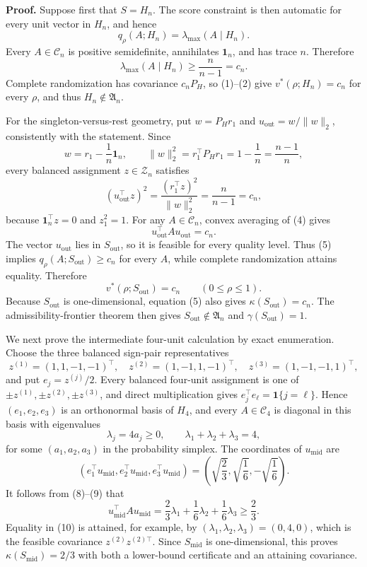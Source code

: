 \textbf{Proof.}
Suppose first that \(S=H_n\). The score constraint is then automatic for every unit vector in \(H_n\), and hence
\[
q_\rho(A;H_n)=\lambda_{\max}(A\mid H_n).
\tag{1}
\]
Every \(A\in\mathcal C_n\) is positive semidefinite, annihilates \(\mathbf1_n\), and has trace \(n\). Therefore
\[
\lambda_{\max}(A\mid H_n)\geq\frac{n}{n-1}=c_n.
\tag{2}
\]
Complete randomization has covariance \(c_nP_H\), so (1)--(2) give \(v^*(\rho;H_n)=c_n\) for every \(\rho\), and thus \(H_n\notin\mathfrak A_n\).

For the singleton-versus-rest geometry, put \(w=P_Hr_1\) and \(u_{\mathrm{out}}=w/\|w\|_2\), consistently with the statement. Since
\[
w=r_1-\frac1n\mathbf1_n,
\qquad
\|w\|_2^2=r_1^\top P_Hr_1=1-\frac1n=\frac{n-1}{n},
\tag{3}
\]
every balanced assignment \(z\in\mathcal Z_n\) satisfies
\[
(u_{\mathrm{out}}^\top z)^2
=\frac{(r_1^\top z)^2}{\|w\|_2^2}
=\frac{n}{n-1}=c_n,
\tag{4}
\]
because \(\mathbf1_n^\top z=0\) and \(z_1^2=1\). For any \(A\in\mathcal C_n\), convex averaging of (4) gives
\[
u_{\mathrm{out}}^\top Au_{\mathrm{out}}=c_n.
\tag{5}
\]
The vector \(u_{\mathrm{out}}\) lies in \(S_{\mathrm{out}}\), so it is feasible for every quality level. Thus (5) implies \(q_\rho(A;S_{\mathrm{out}})\geq c_n\) for every \(A\), while complete randomization attains equality. Therefore
\[
v^*(\rho;S_{\mathrm{out}})=c_n
\qquad(0\leq\rho\leq1).
\tag{6}
\]
Because \(S_{\mathrm{out}}\) is one-dimensional, equation (5) also gives \(\kappa(S_{\mathrm{out}})=c_n\). The admissibility-frontier theorem then gives \(S_{\mathrm{out}}\notin\mathfrak A_n\) and \(\gamma(S_{\mathrm{out}})=1\).

We next prove the intermediate four-unit calculation by exact enumeration. Choose the three balanced sign-pair representatives
\[
z^{(1)}=(1,1,-1,-1)^\top,
\quad
z^{(2)}=(1,-1,1,-1)^\top,
\quad
z^{(3)}=(1,-1,-1,1)^\top,
\tag{7}
\]
and put \(e_j=z^{(j)}/2\). Every balanced four-unit assignment is one of \(\pm z^{(1)},\pm z^{(2)},\pm z^{(3)}\), and direct multiplication gives \(e_j^\top e_\ell=\mathbf1\{j=\ell\}\). Hence \((e_1,e_2,e_3)\) is an orthonormal basis of \(H_4\), and every \(A\in\mathcal C_4\) is diagonal in this basis with eigenvalues
\[
\lambda_j=4a_j\geq0,
\qquad
\lambda_1+\lambda_2+\lambda_3=4,
\tag{8}
\]
for some \((a_1,a_2,a_3)\) in the probability simplex. The coordinates of \(u_{\mathrm{mid}}\) are
\[
(e_1^\top u_{\mathrm{mid}},e_2^\top u_{\mathrm{mid}},e_3^\top u_{\mathrm{mid}})
=\left(\sqrt{\frac23},\sqrt{\frac16},-\sqrt{\frac16}\right).
\tag{9}
\]
It follows from (8)--(9) that
\[
u_{\mathrm{mid}}^\top Au_{\mathrm{mid}}
=\frac23\lambda_1+\frac16\lambda_2+\frac16\lambda_3
\geq\frac23.
\tag{10}
\]
Equality in (10) is attained, for example, by \((\lambda_1,\lambda_2,\lambda_3)=(0,4,0)\), which is the feasible covariance \(z^{(2)}z^{(2)\top}\). Since \(S_{\mathrm{mid}}\) is one-dimensional, this proves \(\kappa(S_{\mathrm{mid}})=2/3\) with both a lower-bound certificate and an attaining covariance.

